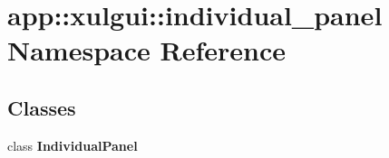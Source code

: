 \section{app::xulgui::individual\_\-panel Namespace Reference}
\label{namespaceapp_1_1xulgui_1_1individual__panel}


\subsection*{Classes}
\begin{CompactItemize}
\item 
class {\bf IndividualPanel}
\end{CompactItemize}

